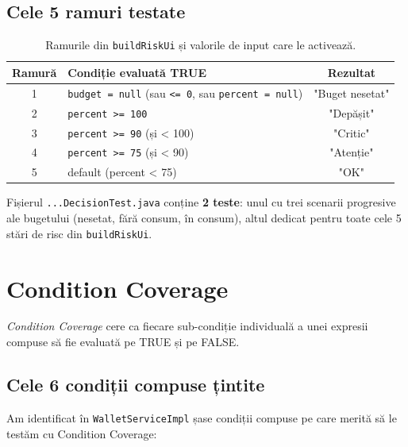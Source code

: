 \subsection{Cele 5 ramuri testate}

\begin{table}[!htb]
\centering
\caption{Ramurile din \texttt{buildRiskUi} și valorile de input care le activează.}
\label{tab:dec-buildRiskUi}
\begin{tabularx}{\linewidth}{cXc}
\toprule
\textbf{Ramură} & \textbf{Condiție evaluată TRUE} & \textbf{Rezultat} \\
\midrule
1 & \texttt{budget = null} (sau \texttt{<= 0}, sau \texttt{percent = null}) & "Buget nesetat" \\
2 & \texttt{percent >= 100} & "Depășit" \\
3 & \texttt{percent >= 90} (și < 100) & "Critic" \\
4 & \texttt{percent >= 75} (și < 90) & "Atenție" \\
5 & default (percent < 75) & "OK" \\
\bottomrule
\end{tabularx}
\end{table}

Fișierul \texttt{...DecisionTest.java} conține \textbf{2 teste}: unul cu trei scenarii progresive ale bugetului (nesetat, fără consum, în consum), altul dedicat pentru toate cele 5 stări de risc din \texttt{buildRiskUi}.

\section{Condition Coverage}
\label{sec:cond}

\textit{Condition Coverage} cere ca fiecare sub-condiție individuală a unei expresii compuse să fie evaluată pe TRUE și pe FALSE.

\subsection{Cele 6 condiții compuse țintite}

Am identificat în \texttt{WalletServiceImpl} șase condiții compuse pe care merită să le testăm cu Condition Coverage:

